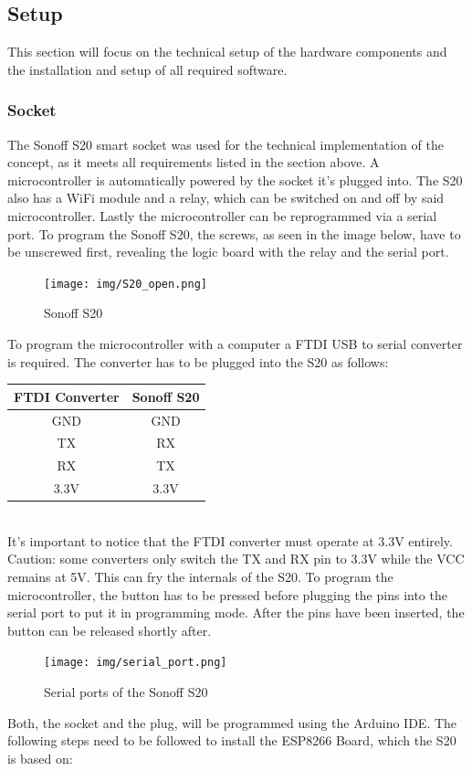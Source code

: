 \newpage
\subsection{Setup}
This section will focus on the technical setup of the hardware components and the installation and setup of all required software.
\\
\subsubsection{Socket}
The Sonoff S20 smart socket was used for the technical implementation of the concept, as it meets all requirements listed in the section above. A microcontroller is automatically powered by the socket it's plugged into. The S20 also has a WiFi module and a relay, which can be switched on and off by said microcontroller. Lastly the microcontroller can be reprogrammed via a serial port.
To program the Sonoff S20, the screws, as seen in the image below, have to be unscrewed first, revealing the logic board with the relay and the serial port.
\\
\begin{figure}[H]
    \texttt{[image: img/S20\_open.png]}
    \caption{Sonoff S20}
    \label{fig:S20}
\end{figure}
\newpage
To program the microcontroller with a computer a FTDI USB to serial converter is required. The converter has to be plugged into the S20 as follows:
\\
\begin{center}
    \begin{tabular} { |c|c| }
        \hline
        FTDI Converter & Sonoff S20 \\
        \hline\hline
        GND & GND \\
        \hline
        TX & RX \\
        \hline
        RX & TX \\
        \hline
        3.3V & 3.3V \\
        \hline
    \end{tabular}
\end{center}
\leavevmode
\\
It's important to notice that the FTDI converter must operate at 3.3V entirely. Caution: some converters only switch the TX and RX pin to 3.3V while the VCC remains at 5V. This can fry the internals of the S20. To program the microcontroller, the button has to be pressed before plugging the pins into the serial port to put it in programming mode. After the pins have been inserted, the button can be released shortly after.
\\
\begin{figure}[H]
    \texttt{[image: img/serial\_port.png]}
    \caption{Serial ports of the Sonoff S20}
    \label{fig:S20_serial}
\end{figure}
\newpage
Both, the socket and the plug, will be programmed using the Arduino IDE. The following steps need to be followed to install the ESP8266 Board, which the S20 is based on:

